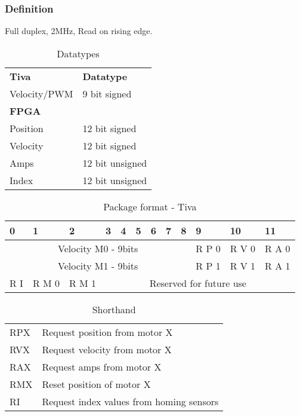 \documentclass[../../../main]{subfiles}
\begin{document}
\subsubsection{Definition}
\label{sub:definition}
Full duplex, 2MHz, Read on rising edge.
\begin{table}[h]
	\centering
	\begin{tabular}{ll}
		\textbf{Tiva}& \textbf{Datatype}  \\
		Velocity/PWM& 9 bit signed \\
		\textbf{FPGA}& \\
		Position& 12 bit signed \\
		Velocity& 12 bit signed \\
		Amps& 12 bit unsigned \\
		Index& 12 bit unsigned 
	\end{tabular}
	\caption{Datatypes}
	\label{tab:spi_datatypes}
\end{table}

\begin{table}[h]
	\centering
	\caption{Package format - Tiva}
	\label{tab:package_format_tiva}
	\begin{tabular}{|*{12}{p{.25cm}|}}
		\hline
		0&1&2&3&4&5&6&7&8&9&10&11\\ 
		\hline
		\multicolumn{9}{|c|}{Velocity M0  - 9bits} & R P 0 & R V 0 & R A 0 \\
		\hline
		\multicolumn{9}{|c|}{Velocity M1  - 9bits} & R P 1 & R V 1 & R A 1 \\
		\hline
		R I & R M 0 & R M 1 & \multicolumn{9}{c|}{Reserved for future use}\\
		\hline
	\end{tabular}
\end{table}
\begin{table}[h]
	\centering
	\caption{Shorthand}
	\label{tab:shorthand}
	\begin{tabular}{ll}
	RPX & Request position from motor X\\
	RVX & Request velocity from motor X\\
	RAX & Request amps from motor X\\
	RMX & Reset position of motor X\\
	RI & Request index values from homing sensors
	\end{tabular}
\end{table}
\end{document}
